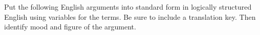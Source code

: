 \begin{exercises}


\end{exercises}

\noindent\problempart Put the following English arguments into standard form in logically structured English using variables for the terms. Be sure to include a translation key. Then identify mood and figure of the argument.


